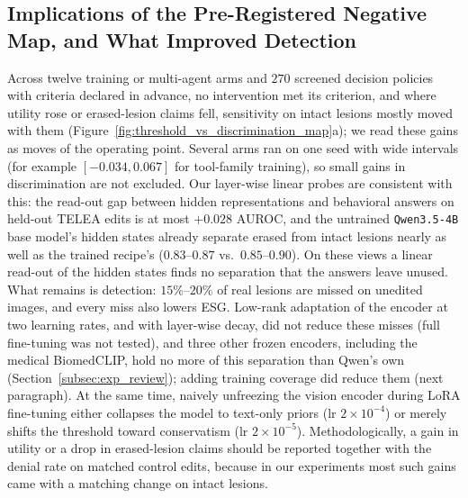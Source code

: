 \documentclass[5p,times,twocolumn,authoryear]{elsarticle}
\begin{document}
\subsection{Implications of the Pre-Registered Negative Map, and What Improved Detection}
\label{subsec:disc_negative_map}
Across twelve training or multi-agent arms and $270$ screened decision policies with criteria declared in advance, no intervention met its criterion, and where utility rose or erased-lesion claims fell, sensitivity on intact lesions mostly moved with them (Figure~\ref{fig:threshold_vs_discrimination_map}a); we read these gains as moves of the operating point. Several arms ran on one seed with wide intervals (for example $[-0.034, 0.067]$ for tool-family training), so small gains in discrimination are not excluded. Our layer-wise linear probes are consistent with this: the read-out gap between hidden representations and behavioral answers on held-out TELEA edits is at most $+0.028$ AUROC, and the untrained \texttt{Qwen3.5-4B} base model's hidden states already separate erased from intact lesions nearly as well as the trained recipe's ($0.83\text{--}0.87$ vs.\ $0.85\text{--}0.90$). On these views a linear read-out of the hidden states finds no separation that the answers leave unused. What remains is detection: $15\%\text{--}20\%$ of real lesions are missed on unedited images, and every miss also lowers ESG. Low-rank adaptation of the encoder at two learning rates, and with layer-wise decay, did not reduce these misses (full fine-tuning was not tested), and three other frozen encoders, including the medical BiomedCLIP, hold no more of this separation than Qwen's own (Section~\ref{subsec:exp_review}); adding training coverage did reduce them (next paragraph). At the same time, naively unfreezing the vision encoder during LoRA fine-tuning either collapses the model to text-only priors ($\text{lr } 2\times 10^{-4}$) or merely shifts the threshold toward conservatism ($\text{lr } 2\times 10^{-5}$). Methodologically, a gain in utility or a drop in erased-lesion claims should be reported together with the denial rate on matched control edits, because in our experiments most such gains came with a matching change on intact lesions.
\end{document}
